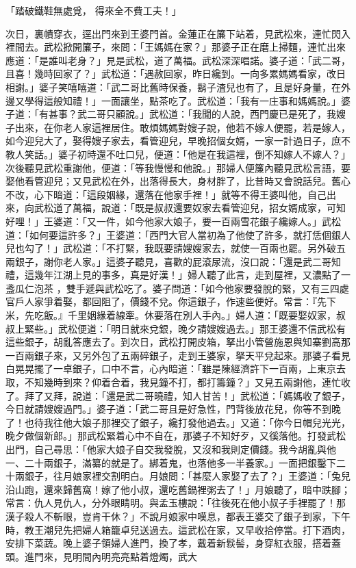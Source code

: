\begin{showcontents}{}
「踏破鐵鞋無處覓，  得來全不費工夫！」

次日，裏幘穿衣，逕出門來到王婆門首。金蓮正在簾下站着，見武松來，連忙閃入裡間去。武松掀開簾子，來問：「王媽媽在家？」那婆子正在磨上掃麵，連忙出來應道：「是誰叫老身？」見是武松，道了萬福。武松深深唱諾。婆子道：「武二哥，且喜！幾時回家了？」武松道：「遇赦回家，昨日纔到。一向多累媽媽看家，改日相謝。」婆子笑嘻嘻道：「武二哥比舊時保養，鬍子渣兒也有了，且是好身量，在外邊又學得這般知禮！」一面讓坐，點茶吃了。武松道：「我有一庄事和媽媽說。」婆子道：「有甚事？武二哥只顧說。」武松道：「我聞的人說，西門慶已是死了，我嫂子出來，在你老人家這裡居住。敢煩媽媽對嫂子說，他若不嫁人便罷，若是嫁人，如今迎兒大了，娶得嫂子家去，看管迎兒，早晚招個女婿，一家一計過日子，庶不教人笑話。」婆子初時還不吐口兒，便道：「他是在我這裡，倒不知嫁人不嫁人？」次後聽見武松重謝他，便道：「等我慢慢和他說。」那婦人便簾內聽見武松言語，要娶他看管迎兒；又見武松在外，出落得長大，身材胖了，比昔時又會說話兒。舊心不改，心下暗道：「這段姻緣，還落在他家手裡！」就等不得王婆叫他，自己出來，向武松道了萬福，說道：「既是叔叔還要奴家去看管迎兒，招女婿成家，可知好哩！」王婆道：「又一件，如今他家大娘子，要一百兩雪花銀子纔嫁人。」武松道：「如何要這許多？」王婆道：「西門大官人當初為了他使了許多，就打恁個銀人兒也勾了！」武松道：「不打緊，我既要請嫂嫂家去，就使一百兩也罷。另外破五兩銀子，謝你老人家。」這婆子聽見，喜歡的屁滾尿流，沒口說：「還是武二哥知禮，這幾年江湖上見的事多，真是好漢！」婦人聽了此言，走到屋裡，又濃點了一盞瓜仁泡茶 ，雙手遞與武松吃了。婆子問道：「如今他家要發脫的緊，又有三四處官戶人家爭着娶，都回阻了，價錢不兌。你這銀子，作速些便好。常言：『先下米，先吃飯。』千里姻緣着線牽。休要落在別人手內。」婦人道：「既要娶奴家，叔叔上緊些。」武松便道：「明日就來兌銀，晚夕請嫂嫂過去。」那王婆還不信武松有這些銀子，胡亂答應去了。到次日，武松打開皮箱，拏出小管營施恩與知寨劉高那一百兩銀子來，又另外包了五兩碎銀子，走到王婆家，拏天平兌起來。那婆子看見白晃晃擺了一卓銀子，口中不言，心內暗道：「雖是陳經濟許下一百兩，上東京去取，不知幾時到來？仰着合着，我見鐘不打，都打籌鐘？」又見五兩謝他，連忙收了。拜了又拜，說道：「還是武二哥曉禮，知人甘苦！」武松道：「媽媽收了銀子，今日就請嫂嫂過門。」婆子道：「武二哥且是好急性，門背後放花兒，你等不到晚了！也待我往他大娘子那裡交了銀子，纔打發他過去。」又道：「你今日帽兒光光，晚夕做個新郎。」那武松緊着心中不自在，那婆子不知好歹，又徯落他。打發武松出門，自己尋思：「他家大娘子自交我發脫，又沒和我則定價錢。我今胡亂與他一、二十兩銀子，滿纂的就是了。綁着鬼，也落他多一半養家。」一面把銀鑿下二十兩銀子，往月娘家裡交割明白。月娘問：「甚麼人家娶了去了？」王婆道：「兔兒沿山跑，還來歸舊窩！嫁了他小叔，還吃舊鍋裡粥去了！」月娘聽了，暗中跌腳；常言：仇人見仇人，分外眼睛明。與孟玉樓說：「往後死在他小叔子手裡罷了！那漢子殺人不斬眼，豈肯干休？」不說月娘家中嘆息，都表王婆交了銀子到家，下午時，教王潮兒先把婦人箱籠卓兒送過去。這武松在家，又早收拾停當。打下酒肉，安排下菜蔬。晚上婆子領婦人進門，換了孝，戴着新䯼髻，身穿紅衣服，搭着蓋頭。進門來，見明間內明亮亮點着燈燭，武大
\end{showcontents}
